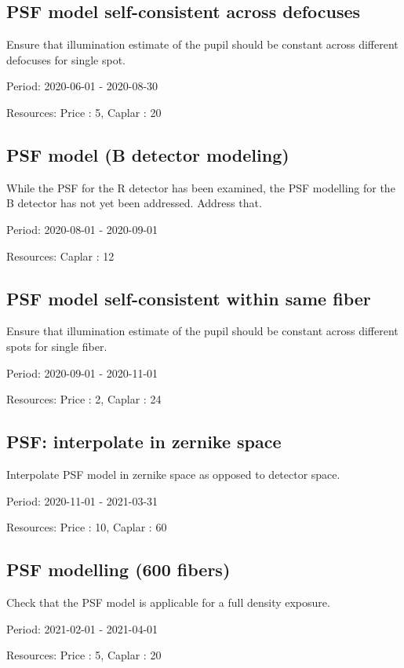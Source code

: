 \subsection{PSF model self-consistent across defocuses}

Ensure that illumination estimate of the pupil should be constant across different defocuses for single spot.

Period: 2020-06-01 - 2020-08-30

Resources: Price : 5, Caplar : 20

\subsection{PSF model (B detector modeling)}

While the PSF for the R detector has been examined, the PSF modelling for the B detector has not yet been addressed. Address that.

Period: 2020-08-01 - 2020-09-01

Resources: Caplar : 12

\subsection{PSF model self-consistent within same fiber}

Ensure that illumination estimate of the pupil should be constant across different spots for single fiber.

Period: 2020-09-01 - 2020-11-01

Resources: Price : 2, Caplar : 24

\subsection{PSF: interpolate in zernike space}

Interpolate PSF model in zernike space as opposed to detector space.

Period: 2020-11-01 - 2021-03-31

Resources: Price : 10, Caplar : 60

\subsection{PSF modelling (600 fibers)}

Check that the PSF model is applicable for a full density exposure.

Period: 2021-02-01 - 2021-04-01

Resources: Price : 5, Caplar : 20

